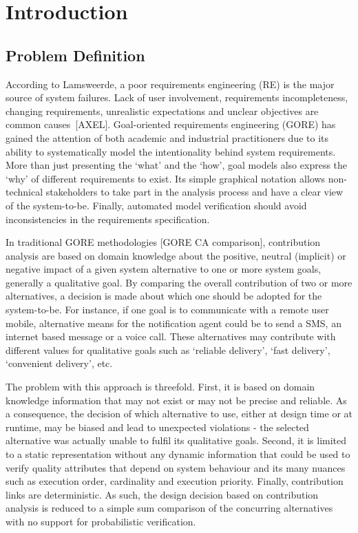 \chapter{Introduction}\label{ch_introduction}%

\section{Problem Definition}

According to Lamsweerde, a poor requirements engineering (RE) is the major source of system failures. Lack of user involvement, requirements incompleteness, changing requirements, unrealistic expectations and unclear objectives are common causes~[AXEL]. Goal-oriented requirements engineering (GORE) has gained the attention of both academic and industrial practitioners due to its ability to systematically model the intentionality behind system requirements. More than just presenting the `what' and the `how', goal models also express the `why' of different requirements to exist. Its simple graphical notation allows non-technical stakeholders to take part in the analysis process and have a clear view of the system-to-be. Finally, automated model verification should avoid inconsistencies in the requirements specification.


In traditional GORE methodologies [GORE CA comparison], contribution  analysis are based on domain knowledge about the positive, neutral (implicit) or negative impact of a given system alternative to one or more system goals, generally a qualitative goal. By  comparing the overall contribution of two or more alternatives, a decision is made about which one should be adopted for the system-to-be. For instance, if one goal is to communicate with a remote user mobile, alternative means for the notification agent could be to send a SMS, an internet based message or a voice call. These alternatives may contribute with different values for qualitative goals such as `reliable delivery', `fast delivery', `convenient delivery', etc. 

The problem with this approach is threefold. First, it is based on domain knowledge information that may not exist or may not be precise and reliable. As a consequence, the decision of which alternative to use, either at design time or at runtime, may be biased and lead to unexpected violations - the selected alternative was actually unable to fulfil its qualitative goals. Second, it is limited to a static representation without any dynamic information that could be used to verify quality attributes that depend on system behaviour and its many nuances such as execution order, cardinality and execution priority. Finally, contribution links are deterministic. As such, the design decision based on contribution analysis is reduced to a simple sum comparison of the concurring alternatives with no support for probabilistic verification.

